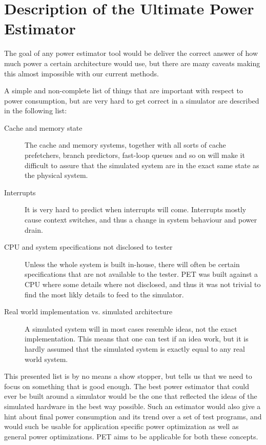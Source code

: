 \section{Description of the Ultimate Power Estimator}
The goal of any power estimator tool would be deliver the correct answer
of how much power a certain architecture would use, but there are many
caveats making this almost impossible with our current methods.

A simple and non-complete list of things that are important with respect to power consumption,
but are very hard to get correct in a simulator are described in the following list:
    \begin{description}
    \item[Cache and memory state]
        The cache and memory systems, together with all sorts of cache prefetchers, branch predictors,
        fast-loop queues and so on will make it difficult to assure that the simulated system are in
        the exact same state as the physical system.
    \item[Interrupts]
        It is very hard to predict when interrupts will come. Interrupts mostly cause context switches,
        and thus a change in system behaviour and power drain.
    \item[CPU and system specifications not disclosed to tester]
        Unless the whole system is built in-house, there will often be certain specifications that
        are not available to the tester. PET was built against a CPU where some details where not disclosed,
        and thus it was not trivial to find the most likly details to feed to the simulator.
    \item[Real world implementation vs. simulated architecture]
        A simulated system will in most cases resemble ideas, not the exact implementation. This means
        that one can test if an idea work, but it is hardly assumed that the simulated system is exactly
        equal to any real world system.
    \end{description}
This presented list is by no means a show stopper, but tells us
that we need to focus on something that is good enough. The best power estimator that could
ever be built around a simulator would be the one that reflected the ideas of the simulated
hardware in the best way possible. Such an estimator would also give a hint about final power
consumption and its trend over a set of test programs, and would such be usable for application
specific power optimization as well as general power optimizations. PET aims to be applicable for
both these concepts.
